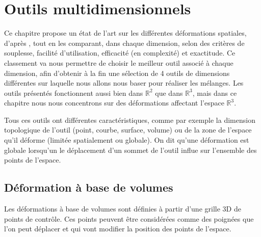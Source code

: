 

\chapter{Outils multidimensionnels}

\graphicspath{{Chapter1/Chapter1Figs/PNG/}{Chapter1/Chapter1Figs/PDF/}{Chapter1/Chapter1Figs/}}

Ce chapitre propose un état de l'art sur les différentes déformations
spatiales, d'après \cite{GB08}, tout en les comparant, dans chaque
dimension, selon des critères de souplesse, facilité d'utilisation,
efficacité (en complexité) et exactitude. Ce classement va nous
permettre de choisir le meilleur outil associé à chaque dimension,
afin d'obtenir à la fin une sélection de 4 outils de dimensions
différentes sur laquelle nous allons nous baser pour réaliser les
mélanges. Les outils présentés fonctionnent aussi bien dans
$\mathbb{R}^2$ que dans $\mathbb{R}^3$, mais dans ce chapitre nous
nous concentrons sur des déformations affectant l'espace
$\mathbb{R}^3$.

Tous ces outils ont différentes caractéristiques, comme par exemple la
dimension topologique de l'outil (point, courbe, surface, volume) ou
de la zone de l'espace qu'il déforme (limitée spatialement ou
globale). On dit qu'une déformation est globale lorsqu'un le
déplacement d'un sommet de l'outil influe sur l'ensemble des points de
l'espace.

\section{Déformation à base de volumes}
Les déformations à base de volumes sont définies à partir d'une grille
3D de points de contrôle. Ces points peuvent être considérées comme
des poignées que l'on peut déplacer et qui vont modifier la position
des points de l'espace.

